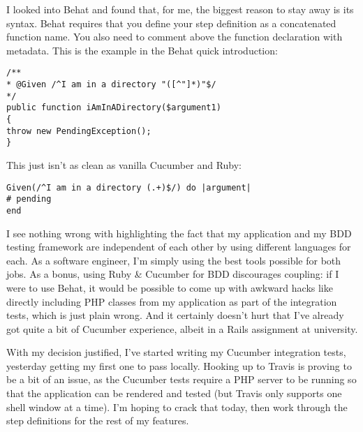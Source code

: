 I looked into Behat and found that, for me, the biggest reason to stay away is its syntax. Behat requires that you define your step definition as a concatenated function name. You also need to comment above the function declaration with metadata. This is the example in the Behat quick introduction:

\begin{minipage}{\textwidth}
\begin{lstlisting}
/**
* @Given /^I am in a directory "([^"]*)"$/
*/
public function iAmInADirectory($argument1)
{
throw new PendingException();
}
\end{lstlisting}
\end{minipage}

This just isn't as clean as vanilla Cucumber and Ruby:

\begin{minipage}{\textwidth}
\begin{lstlisting}
Given(/^I am in a directory (.+)$/) do |argument|
# pending
end
\end{lstlisting}
\end{minipage}

I see nothing wrong with highlighting the fact that my application and my BDD testing framework are independent of each other by using different languages for each. As a software engineer, I'm simply using the best tools possible for both jobs. As a bonus, using Ruby \& Cucumber for BDD discourages coupling: if I were to use Behat, it would be possible to come up with awkward hacks like directly including PHP classes from my application as part of the integration tests, which is just plain wrong. And it certainly doesn't hurt that I've already got quite a bit of Cucumber experience, albeit in a Rails assignment at university.

With my decision justified, I've started writing my Cucumber integration tests, yesterday getting my first one to pass locally. Hooking up to Travis is proving to be a bit of an issue, as the Cucumber tests require a PHP server to be running so that the application can be rendered and tested (but Travis only supports one shell window at a time). I'm hoping to crack that today, then work through the step definitions for the rest of my features.